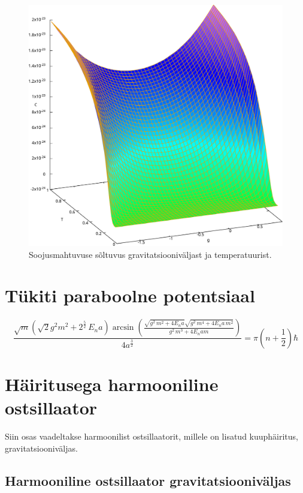 \documentclass{trkut}%
\begin{document}
\begin{figure}[htb]
    \includegraphics[width=\textwidth]{maxima/m1a1b2T0_1S400.pdf}
    \caption{Soojusmahtuvuse sõltuvus gravitatsiooniväljast ja temperatuurist.}
\end{figure}

\section{Tükiti paraboolne potentsiaal}

\begin{equation}
    \frac{\sqrt{m} \left( \sqrt{2} {g}^{2} m^2 + {{2}^{\frac{5}{2}}}\, {E_n} a\right)  \arcsin\left( \frac{\sqrt{{{g}^{2}}\, {{m}^{2}}+4 {E_n} a} \sqrt{{{g}^{2}}\, {{m}^{4}}+4 {E_n} a\, {{m}^{2}}}}{{{g}^{2}}\, {{m}^{3}}+4 {E_n} a m}\right) }{4 {{a}^{\frac{3}{2}}}}=\ensuremath{\pi}  \left( n+\frac{1}{2}\right)  \hbar
\end{equation}

\section{Häiritusega harmooniline ostsillaator}

Siin osas vaadeltakse harmoonilist ostsillaatorit, millele on lisatud kuuphäiritus, gravitatsiooniväljas.

\subsection{Harmooniline ostsillaator gravitatsiooniväljas}
\end{document}
